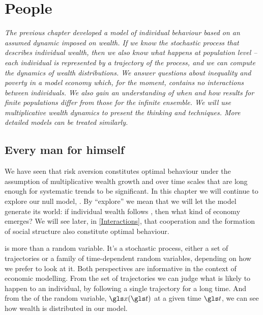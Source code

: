 
\chapter{People}
{\it 
The previous chapter developed a model of individual behaviour based on an
assumed dynamic imposed on wealth. If we know the stochastic process that describes
individual wealth, then we also know what happens at population level -- each individual
is represented by a trajectory of the process, and we can compute 
the dynamics of wealth distributions. We answer questions about inequality and poverty in
a model economy which, for the moment, contains no interactions between individuals. We also gain an understanding of when and how results for finite populations differ from those for the infinite ensemble. We will use multiplicative wealth dynamics to present the thinking and techniques. More detailed models can be treated similarly.}
\newpage


\section{Every man for himself}

We have seen that risk aversion constitutes optimal behaviour under the assumption 
of multiplicative wealth growth and over time scales that are long enough for systematic 
trends to be significant. In this chapter we will continue to explore our null model, 
\GBM. By ``explore'' we mean that we will let the model generate its world: if 
individual wealth follows \GBM, then what kind of economy emerges? 
We will see later, in \cref{Interactions}, that cooperation and the formation of social structure also constitute optimal behaviour.

\GBM is more than a random variable. It's a stochastic process, either a set of trajectories 
or a family of time-dependent random variables, depending on how we 
prefer to look at it.  Both perspectives are informative in the context of economic modelling.
From the set of trajectories we can judge what is likely to happen to an individual, 
\eg by following a single trajectory for a long time. And from the \PDFa of the random 
variable, $\x(\t)$ at a given time $\t$, we can see how wealth is distributed in our model. 

